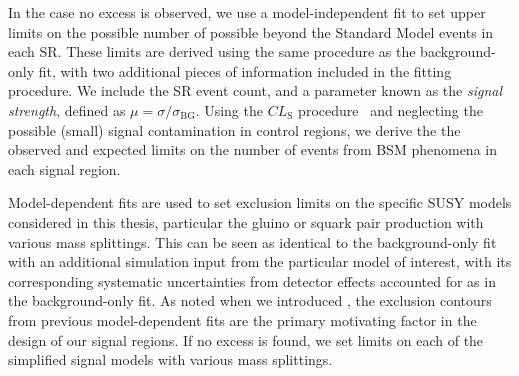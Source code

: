 In the case no excess is observed, we use a model-independent fit to set upper limits on the possible number of possible beyond the Standard Model events in each SR.
These limits are derived using the same procedure as the background-only fit, with two additional pieces of information included in the fitting procedure.
We include the SR event count, and a parameter known as the \textit{signal strength}, defined as $\mu = \sigma/\sigma_{\mathrm{BG}}$.
Using the $CL_{\mathrm{S}}$ procedure~\cite{Feldman:1997qc} and neglecting the possible (small) signal contamination in control regions, we derive the the observed and expected limits on the number of events from BSM phenomena in each signal region.

Model-dependent fits are used to set exclusion limits on the specific SUSY models considered in this thesis, particular the gluino or squark pair production with various mass splittings.
This can be seen as identical to the background-only fit with an additional simulation input from the particular model of interest, with its corresponding systematic uncertainties from detector effects accounted for as in the background-only fit.
As noted when we introduced , the exclusion contours from previous model-dependent fits are the primary motivating factor in the design of our signal regions.
If no excess is found, we set limits on each of the simplified signal models with various mass splittings.
